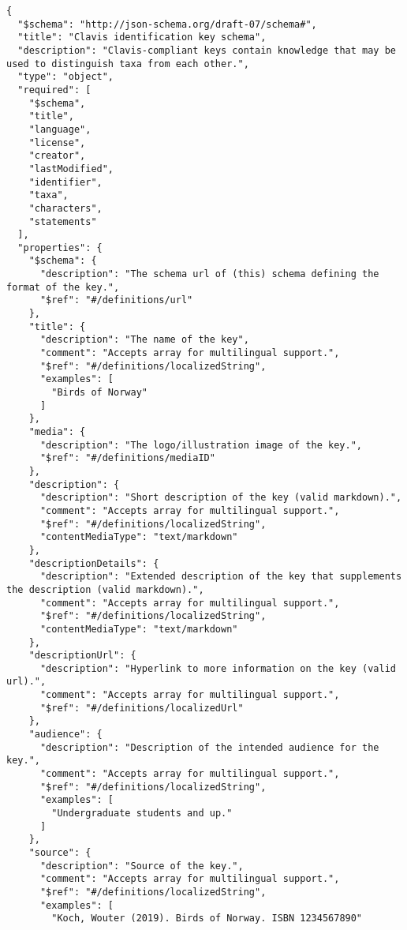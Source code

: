 \documentclass[10pt,letterpaper]{article}
\begin{document}
\vspace*{0.2in}

\begin{flushleft}
{\Large
\textbf{}}
\newline
\end{flushleft}
\linenumbers
\begin{verbatim}
{
  "$schema": "http://json-schema.org/draft-07/schema#",
  "title": "Clavis identification key schema",
  "description": "Clavis-compliant keys contain knowledge that may be
used to distinguish taxa from each other.",
  "type": "object",
  "required": [
    "$schema",
    "title",
    "language",
    "license",
    "creator",
    "lastModified",
    "identifier",
    "taxa",
    "characters",
    "statements"
  ],
  "properties": {
    "$schema": {
      "description": "The schema url of (this) schema defining the
format of the key.",
      "$ref": "#/definitions/url"
    },
    "title": {
      "description": "The name of the key",
      "comment": "Accepts array for multilingual support.",
      "$ref": "#/definitions/localizedString",
      "examples": [
        "Birds of Norway"
      ]
    },
    "media": {
      "description": "The logo/illustration image of the key.",
      "$ref": "#/definitions/mediaID"
    },
    "description": {
      "description": "Short description of the key (valid markdown).",
      "comment": "Accepts array for multilingual support.",
      "$ref": "#/definitions/localizedString",
      "contentMediaType": "text/markdown"
    },
    "descriptionDetails": {
      "description": "Extended description of the key that supplements
the description (valid markdown).",
      "comment": "Accepts array for multilingual support.",
      "$ref": "#/definitions/localizedString",
      "contentMediaType": "text/markdown"
    },
    "descriptionUrl": {
      "description": "Hyperlink to more information on the key (valid
url).",
      "comment": "Accepts array for multilingual support.",
      "$ref": "#/definitions/localizedUrl"
    },
    "audience": {
      "description": "Description of the intended audience for the
key.",
      "comment": "Accepts array for multilingual support.",
      "$ref": "#/definitions/localizedString",
      "examples": [
        "Undergraduate students and up."
      ]
    },
    "source": {
      "description": "Source of the key.",
      "comment": "Accepts array for multilingual support.",
      "$ref": "#/definitions/localizedString",
      "examples": [
        "Koch, Wouter (2019). Birds of Norway. ISBN 1234567890"

\end{verbatim}
\end{document}
